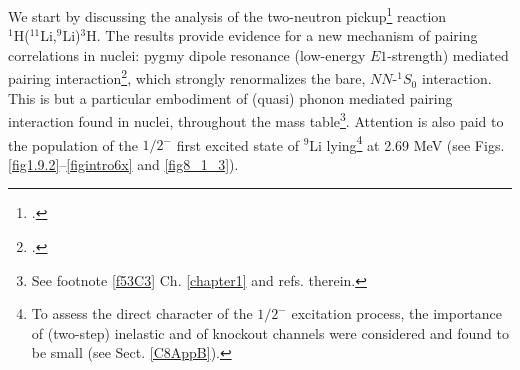  We start by discussing  the analysis of the two-neutron pickup\footnote{\cite{Tanihata:08}.} reaction\\ $^1$H($^{11}$Li,$^9$Li)$^3$H. The results  provide evidence for a new mechanism of pairing correlations in nuclei: pygmy dipole resonance (low-energy $E1$-strength) mediated pairing interaction\footnote{\citet{Barranco:01,Potel:10}.}, which strongly renormalizes the bare, $NN$-$^1S_0$ interaction. This is but a particular embodiment of (quasi) phonon mediated pairing interaction found  in nuclei, throughout the mass table\footnote{See footnote \ref{f53C3} Ch. \ref{chapter1} and refs. therein.}. Attention is also paid to the  population of the $1/2^-$ first excited state of $^9$Li lying\footnote{To assess the direct character of the $1/2^-$ excitation process, the importance of (two-step) inelastic  and of knockout  channels were considered and found to be small (see Sect. \ref{C8AppB}).} at 2.69 MeV (see Figs. \ref{fig1.9.2}--\ref{figintro6x} and  \ref{fig8_1_3}). 
 
 
 
